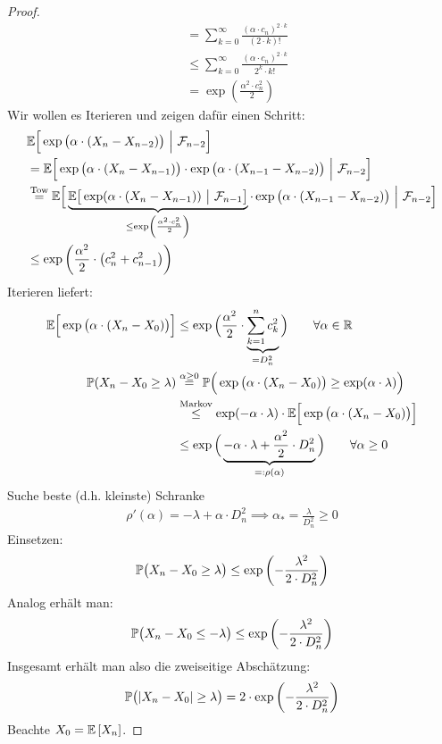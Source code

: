 \begin{proof}
\begin{align*}
&=\sum\limits_{k=0}^\infty\frac{(\alpha\cdot c_n)^{2\cdot k}}{(2\cdot k)!}\\
&\leq\sum\limits_{k=0}^\infty\frac{(\alpha\cdot c_n)^{2\cdot k}}{2^k\cdot k!}\\
&=\exp\left(\frac{\alpha^2\cdot c_n^2}{2}\right)
\end{align*}
Wir wollen es Iterieren und zeigen dafür einen Schritt:
\begin{align*}
&\E\Big[\exp\big(\alpha\cdot(X_n-X_{n-2})\big)~\Big|~\F_{n-2}\Big]\\
&=\E\Big[\exp\big(\alpha\cdot(X_n-X_{n-1})\big)\cdot\exp\big(\alpha\cdot(X_{n-1}-X_{n-2})\big)~\Big|~\F_{n-2}\Big]\\
&\stackeq{\text{Tow}}
\E\Big[\underbrace{\E\big[\exp(\alpha\cdot(X_n-X_{n-1}))~\big|~\F_{n-1}\big]}_{\leq\exp\left(\frac{\alpha^2\cdot c_n^2}{2}\right)}\cdot\exp\big(\alpha\cdot(X_{n-1}-X_{n-2})\big)~\Big|~\F_{n-2}\Big]\\
&\leq
\exp\left(\frac{\alpha^2}{2}\cdot\left(c_n^2+c_{n-1}^2\right)\right)
\end{align*}
Iterieren liefert:
\begin{align*}
\E\Big[\exp\big(\alpha\cdot(X_n-X_0)\big)\Big]
&\leq\exp\Big(\frac{\alpha^2}{2}\cdot\underbrace{\sum\limits_{k=1}^n c_k^2}_{=D_n^2}\Big)\qquad\forall\alpha\in\R\\
\P(X_n-X_0\geq\lambda)
&\stackeq{\alpha\geq0}
\P\Big(\exp\big(\alpha\cdot(X_n-X_0)\big)\geq\exp(\alpha\cdot\lambda)\Big)\\
&\stackrel{\text{Markov}}{\leq}
\exp(-\alpha\cdot\lambda)\cdot\E\Big[\exp\big(\alpha\cdot(X_n-X_0)\big)\Big]\\
&\leq
\exp\Big(\underbrace{-\alpha\cdot\lambda+\frac{\alpha^2}{2}\cdot D_n^2}_{=:\rho(\alpha)}\Big)\qquad\forall\alpha\geq0
\end{align*}
Suche beste (d.h. kleinste) Schranke
\begin{align*}
\rho'(\alpha)=-\lambda+\alpha\cdot D_n^2\implies\alpha_\ast=\frac{\lambda}{D_n^2}\geq0
\end{align*}
Einsetzen:
\begin{align*}
\P\big(X_n-X_0\geq\lambda\big)
\leq\exp\left(-\frac{\lambda^2}{2\cdot D_n^2}\right)
\end{align*}
Analog erhält man:
\begin{align*}
\P\big(X_n-X_0\leq-\lambda\big)
\leq\exp\left(-\frac{\lambda^2}{2\cdot D_n^2}\right)
\end{align*}
Insgesamt erhält man also die zweiseitige Abschätzung:
\begin{align*}
\P\big(|X_n-X_0|\geq\lambda\big)
=2\cdot\exp\left(-\frac{\lambda^2}{2\cdot D_n^2}\right)
\end{align*}
Beachte $X_0=\E\left[X_n\right]$.
\end{proof}

